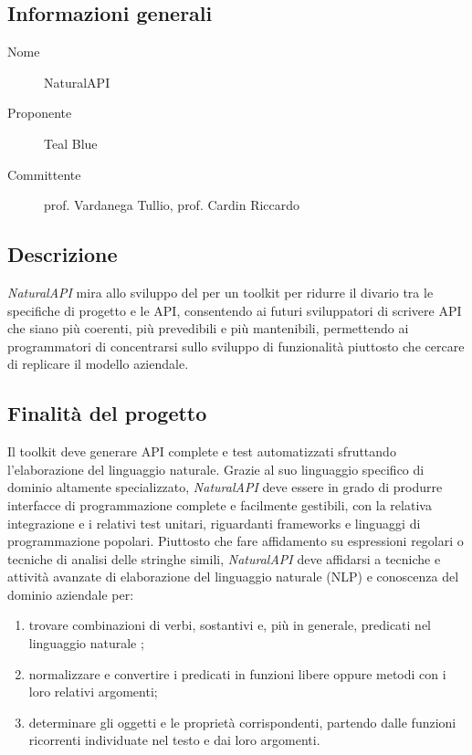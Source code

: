 \documentclass[../studio-di-fattibilita.tex]{subfiles}
\begin{document}
  \subsection{Informazioni generali}%
  \label{subsec:informazioni_generali}
  \begin{description}
    \item[Nome] NaturalAPI
    \item[Proponente] Teal Blue
    \item[Committente] prof. Vardanega Tullio, prof. Cardin Riccardo
  \end{description}


  \subsection{Descrizione}%
  \label{subsec:descrizione}
  \textit{NaturalAPI} mira allo sviluppo del  per un toolkit per ridurre il divario tra le specifiche di progetto e le API, consentendo ai futuri sviluppatori di scrivere API che siano più coerenti, più prevedibili e più mantenibili, permettendo ai programmatori di concentrarsi sullo sviluppo di funzionalità piuttosto che cercare di replicare il modello aziendale.


  \subsection{Finalità del progetto}%
  \label{subsec:finalita_del_progetto}
  Il toolkit deve generare API complete e test automatizzati sfruttando l'elaborazione del linguaggio naturale.
  Grazie al suo linguaggio specifico di dominio altamente specializzato, \textit{NaturalAPI} deve essere in grado di produrre interfacce di programmazione complete e facilmente gestibili, con la relativa integrazione e i relativi test unitari, riguardanti frameworks e linguaggi di programmazione popolari.
  Piuttosto che fare affidamento su espressioni regolari o tecniche di analisi delle stringhe simili, \textit{NaturalAPI} deve affidarsi a tecniche e attività avanzate di elaborazione del linguaggio naturale (NLP) e conoscenza del dominio aziendale per:
    \begin{enumerate}
      \item trovare combinazioni di verbi, sostantivi e, più in generale, predicati nel linguaggio naturale ;
      \item normalizzare e convertire i predicati in funzioni libere oppure metodi con i loro relativi argomenti;
      \item determinare gli oggetti e le proprietà corrispondenti, partendo dalle funzioni ricorrenti individuate nel testo e dai loro argomenti.
    \end{enumerate}
\end{document}
